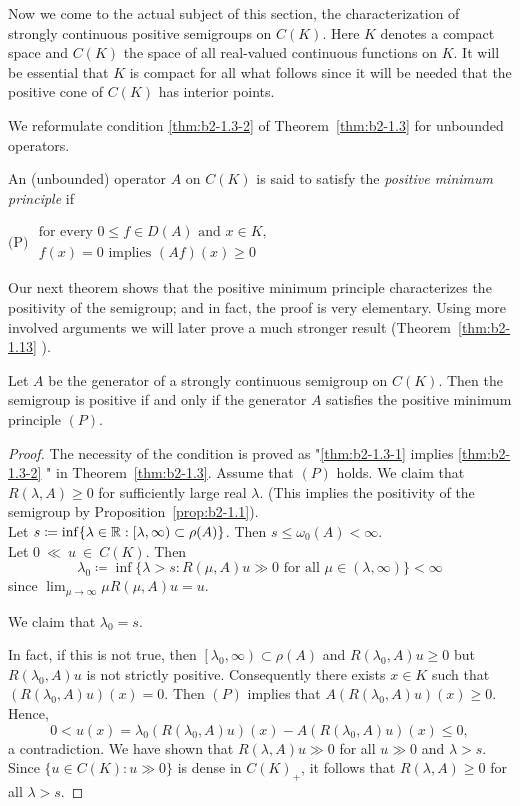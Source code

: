 Now we come to the actual subject of this section, the characterization of strongly continuous positive semigroups on $C(K)$.
Here $K$
denotes a compact space and $C(K)$ the space of all real-valued continuous functions on $K$.
It will be essential that $K$ is compact for all what follows since it will be needed that the positive cone of $C(K)$ has interior points.

We reformulate condition \ref{thm:b2-1.3-2} of Theorem~\ref{thm:b2-1.3} for unbounded operators.

\begin{definition}\label{def:b2-1.5}
An (unbounded) operator $A$ on $C(K)$ is said to satisfy the \emph{positive minimum principle} if

$\text{(P)}$ \qquad $
\begin{array}{l}
	\text{for every } 0 \leq f \in D(A) \text{ and } x \in K,\\
    f(x) = 0 \text{ implies } (Af)(x) \geq 0
\end{array}$
\end{definition}
Our next theorem shows that the positive minimum principle characterizes the positivity of the semigroup; and in fact, the proof is very elementary.
Using more involved arguments we will later prove a much stronger result (Theorem~\ref{thm:b2-1.13} ).
\begin{theorem}\label{thm:b2-1.6}
Let $A$ be the generator of a strongly continuous semigroup on $C(K)$.
Then the semigroup is positive if and only if the generator $A$ satisfies the positive minimum principle $(P)$.
\end{theorem}
\begin{proof}
The necessity of the condition is proved as "\ref{thm:b2-1.3-1} implies \ref{thm:b2-1.3-2} " in Theorem~\ref{thm:b2-1.3}.
Assume that $(P)$ holds.
We claim that $R(\lambda,A) \geq 0$ for sufficiently large real $\lambda$. 
(This implies the positivity of the semigroup by Proposition~\ref{prop:b2-1.1}).
\\
Let $s \coloneqq \inf \{\lambda \in \mathbb{R} : \left[\lambda,\infty \right) \subset \rho(A)\}$.
Then $s \leq \omega_{0}(A) < \infty$.
\\
Let $0~\ll~u~\in~C(K)$.
Then 
\[
\lambda_{0} \coloneqq \inf \{\lambda > s : R(\mu,A)u \gg 0 \text{ for all } \mu \in (\lambda,\infty)\} < \infty
\]
since $\lim_{\mu \to \infty} \mu R(\mu,A)u = u$.

We claim that $\lambda_{0} = s$.

In fact, if this is not true, then $\left[\lambda_{0},\infty\right) \subset \rho(A)$ and $R(\lambda_{0},A)u \geq 0$ but $R(\lambda_{0},A)u$ is not strictly positive.
Consequently there exists $x \in K$ such that $(R(\lambda_{0},A)u)(x) = 0$.
Then $(P)$ implies that $A(R(\lambda_{0},A)u)(x) \geq 0$.
Hence, 
\[
0 < u(x) = \lambda_{0}(R(\lambda_{0},A)u)(x) - A(R(\lambda_{0},A)u)(x) \leq 0,
\]
a contradiction.
We have shown that $R(\lambda,A)u \gg 0$ for all $u \gg 0$ and $\lambda > s$.
Since $\{u \in C(K): u \gg 0\}$ is dense in $C(K)_{+}$, it follows that $R(\lambda,A) \geq 0$ for all $\lambda > s$.
\end{proof}

